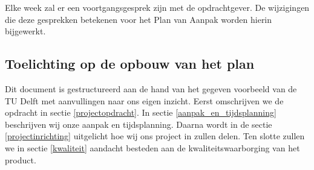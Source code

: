 Elke week zal er een voortgangsgesprek zijn met de opdrachtgever.
De wijzigingen die deze gesprekken betekenen voor het Plan van Aanpak worden hierin bijgewerkt.

\subsection{Toelichting op de opbouw van het plan}


Dit document is gestructureerd aan de hand van het gegeven voorbeeld van de TU Delft met aanvullingen naar ons eigen inzicht.
Eerst omschrijven we de opdracht in sectie \ref{projectopdracht}.
In sectie \ref{aanpak_en_tijdsplanning} beschrijven wij onze aanpak en tijdsplanning.
Daarna wordt in de sectie \ref{projectinrichting} uitgelicht hoe wij ons project in zullen delen.
Ten slotte zullen we in sectie \ref{kwaliteit} aandacht besteden aan de kwaliteitswaarborging van het product.
